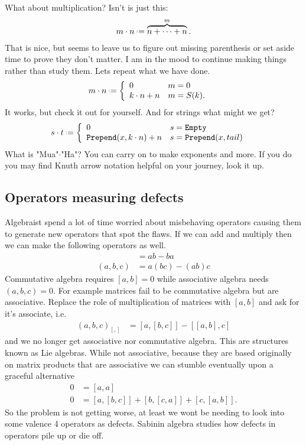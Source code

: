 What about multiplication? Isn't is just this:
\begin{align*}
    m\cdot n\defeq \overbrace{n+\cdots +n}^m.
\end{align*}
That is nice, but seems to leave us to figure out missing parenthesis or set aside 
time to prove they don't matter.  I am in the mood to continue making things rather 
than study them.  Lets repeat what we have done.
\begin{align*}
    m\cdot n & \defeq \left\{
        \begin{array}{ll}
            0 & m=0\\
            k\cdot n+n & m=S(k).
        \end{array}
    \right.
\end{align*}
It works, but check it out for yourself.  And for strings what might we get?
\begin{align*}
    s\cdot t & \defeq \left\{
        \begin{array}{ll}
            0 & s=\texttt{Empty}\\
            \texttt{Prepend}(x,k\cdot n)+n & s=\texttt{Prepend}(x,tail)
        \end{array}
    \right.
\end{align*}
What is "Mua"$\cdot$"Ha"?
You can carry on to make exponents and more.  If you do you may find 
Knuth arrow notation helpful on your journey, look it up.

\subsection{Operators measuring defects}
Algebraist spend a lot of time worried about misbehaving operators 
causing them to generate new operators that spot the flaws.  If 
we can add and multiply then we can make the following operators as well.
\begin{align*}
    [a,b] & = ab-ba \tag{Commutator}\\
    (a,b,c) & = a(bc)-(ab)c \tag{Associator}
\end{align*}
Commutative algebra requires $[a,b]=0$ while associative algebra needs $(a,b,c)=0$.
For example matrices fail to be commutative algebra but are associative.
Replace the role of multiplication of matrices with $[a,b]$ and ask for it's 
associate, i.e.
\begin{align*}
    (a,b,c)_{[,]} & = [a,[b,c]]-[[a,b],c]
\end{align*}
and we no longer get associative nor commutative algebra.  This are structures 
known as Lie algebras.  While not associative, because they are based originally 
on matrix products that are associative we can stumble eventually upon a 
graceful alternative
\begin{align*}
    0 & = [a,a] \tag{Alternating}\\
    0 & = [a,[b,c]]+[b,[c,a]]+[c,[a,b]].    
    \tag{Jacobi}
\end{align*}
So the problem is not getting worse, at least we wont be needing 
to look into some  valence 4 operators as defects.  Sabinin algebra 
studies how defects in operators pile up or die off.



